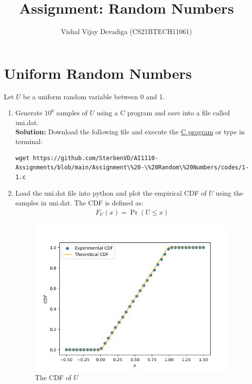 \documentclass[journal,12pt,onecolumn]{IEEEtran}
\title{Assignment: Random Numbers}
\author{Vishal Vijay Devadiga (CS21BTECH11061)}
\date{}
\numberwithin{equation}{section}
\renewcommand\thesection{\arabic{section}}
\providecommand{\pr}[1]{\ensuremath{\Pr\left(#1\right)}}
\providecommand{\gitlink}[2]{{\color{blue}\href{https://github.com/SterbenVD/AI1110-Assignments/blob/main/Assignment\%20-\%20Random\%20Numbers/#1}{#2}}}
\newcommand{\solution}{\noindent \textbf{Solution: }}
\begin{document}
\maketitle

\section{Uniform Random Numbers}
Let $U$ be a uniform random variable between 0 and 1.
\begin{enumerate}[label=\thesection.\arabic*,ref=\thesection.\theenumi]
    \item Generate $10^6$ samples of $U$ using a C program and save into a file called uni.dat.
          \\
          \solution Download the following file and execute the \gitlink{codes/1-1.c}{C program} or type in terminal:
          \begin{lstlisting}
wget https://github.com/SterbenVD/AI1110-Assignments/blob/main/Assignment\%20-\%20Random\%20Numbers/codes/1-1.c
            \end{lstlisting}
    \item
          Load the uni.dat file into python and plot the empirical CDF of $U$ using the samples in uni.dat.
          The CDF is defined as:
          \begin{align}
              F_{U}(x) = \pr{U \le x}
          \end{align}
          \begin{figure}[H]
              \centering
              \includegraphics[scale = 0.7]{../figs/1_cdf.png}
              \caption{The CDF of $U$}

\end{figure}
\end{enumerate}
\end{document}

